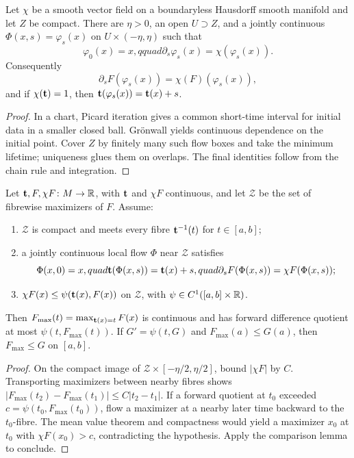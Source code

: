 \begin{lemma}
\label{lem:vector-field-flow-near-compact}




Let $\chi$ be a smooth vector field on a boundaryless Hausdorff smooth
manifold and let $Z$ be compact. There are $\eta>0$, an open
$U\supset Z$, and a jointly continuous
$\Phi(x,s)=\varphi_s(x)$ on $U\times(-\eta,\eta)$ such that
$$\varphi_0(x)=x,qquad \partial_s\varphi_s(x)=\chi(\varphi_s(x)).$$
Consequently
$$\partial_sF(\varphi_s(x))=\chi(F)(\varphi_s(x)),$$
and if $\chi({\bf t})=1$, then
${\bf t}(\varphi_s(x))={\bf t}(x)+s$.
\end{lemma}
\begin{proof}
\sketch

In a chart, Picard iteration gives a common short-time interval for
initial data in a smaller closed ball. Gr\"onwall yields continuous
dependence on the initial point. Cover $Z$ by finitely many such flow
boxes and take the minimum lifetime; uniqueness glues them on overlaps.
The final identities follow from the chain rule and integration.
\end{proof}

\begin{lemma}
\label{lem:forward-difference-maximum-flow}





Let ${\bf t},F,\chi F\colon M\to\mathbb{R}$, with ${\bf t}$ and $\chi F$
continuous, and let $\mathcal Z$ be the set of fibrewise maximizers of
$F$. Assume:
\begin{enumerate}
\item $\mathcal Z$ is compact and meets every fibre
${\bf t}^{-1}(t)$ for $t\in[a,b]$;
\item a jointly continuous local flow $\Phi$ near $\mathcal Z$ satisfies
$$\Phi(x,0)=x,quad {\bf t}(\Phi(x,s))={\bf t}(x)+s,quad
\partial_sF(\Phi(x,s))=\chi F(\Phi(x,s));$$
\item $\chi F(x)\le\psi({\bf t}(x),F(x))$ on $\mathcal Z$, with
$\psi\in C^1([a,b]\times\mathbb{R})$.
\end{enumerate}
Then $F_{\max}(t)=\max_{{\bf t}(x)=t}F(x)$ is continuous and has
forward difference quotient at most $\psi(t,F_{\max}(t))$. If
$G'=\psi(t,G)$ and $F_{\max}(a)\le G(a)$, then
$F_{\max}\le G$ on $[a,b]$.
\end{lemma}
\begin{proof}
\sketch

On the compact image of
$\mathcal Z\times[-\eta/2,\eta/2]$, bound $|\chi F|$ by $C$.
Transporting maximizers between nearby fibres shows
$|F_{\max}(t_2)-F_{\max}(t_1)|\le C|t_2-t_1|$. If a forward quotient
at $t_0$ exceeded $c=\psi(t_0,F_{\max}(t_0))$, flow a maximizer at a
nearby later time backward to the $t_0$-fibre. The mean value theorem
and compactness would yield a maximizer $x_0$ at $t_0$ with
$\chi F(x_0)>c$, contradicting the hypothesis. Apply the comparison
lemma to conclude.
\end{proof}

